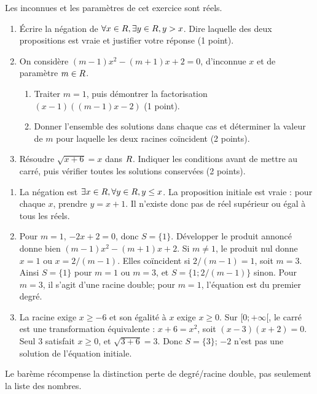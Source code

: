 \label{t11s-ds2-e01}\par
Les inconnues et les paramètres de cet exercice sont réels.
\begin{enumerate}
\item Écrire la négation de $\forall x\in R,\exists y\in R,y>x$. Dire laquelle des deux propositions est vraie et justifier votre réponse (1 point).
\item On considère $(m-1)x^2-(m+1)x+2=0$, d’inconnue $x$ et de paramètre $m\in R$.
\begin{enumerate}
\item Traiter $m=1$, puis démontrer la factorisation $(x-1)((m-1)x-2)$ (1 point).
\item Donner l’ensemble des solutions dans chaque cas et déterminer la valeur de $m$ pour laquelle les deux racines coïncident (2 points).
\end{enumerate}
\item Résoudre $\sqrt{x+6}=x$ dans $R$. Indiquer les conditions avant de mettre au carré, puis vérifier toutes les solutions conservées (2 points).
\end{enumerate}
\begin{corrige}\label{sol-t11s-ds2-e01}
\begin{enumerate}
\item La négation est $\exists x\in R,\forall y\in R,y\le x$. La proposition initiale est vraie : pour chaque $x$, prendre $y=x+1$. Il n’existe donc pas de réel supérieur ou égal à tous les réels.
\item Pour $m=1$, $-2x+2=0$, donc $S=\{1\}$. Développer le produit annoncé donne bien $(m-1)x^2-(m+1)x+2$. Si $m\ne1$, le produit nul donne $x=1$ ou $x=2/(m-1)$. Elles coïncident si $2/(m-1)=1$, soit $m=3$. Ainsi $S=\{1\}$ pour $m=1$ ou $m=3$, et $S=\{1;2/(m-1)\}$ sinon. Pour $m=3$, il s’agit d’une racine double; pour $m=1$, l’équation est du premier degré.
\item La racine exige $x\ge-6$ et son égalité à $x$ exige $x\ge0$. Sur $[0;+\infty[$, le carré est une transformation équivalente : $x+6=x^2$, soit $(x-3)(x+2)=0$. Seul $3$ satisfait $x\ge0$, et $\sqrt{3+6}=3$. Donc $S=\{3\}$; $-2$ n’est pas une solution de l’équation initiale.
\end{enumerate}
Le barème récompense la distinction perte de degré/racine double, pas seulement la liste des nombres.
\end{corrige}
\label{t11s-ds2-e02}\par
